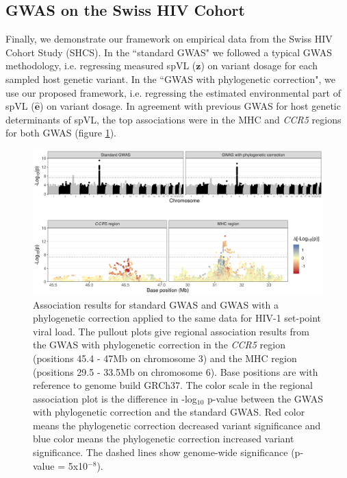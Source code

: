 \documentclass[]{article}
\begin{document}
\begin{doublespace}
\subsection{GWAS on the Swiss HIV Cohort}

Finally, we demonstrate our framework on empirical data from the Swiss HIV Cohort Study (SHCS). In the ``standard GWAS" we followed a typical GWAS methodology,  i.e. regressing measured spVL ($\bm{z}$) on variant dosage for each sampled host genetic variant. In the ``GWAS with phylogenetic correction", we use our proposed framework, i.e. regressing the estimated environmental part of spVL ($\bm{\hat{e}}$) on variant dosage. In agreement with previous GWAS for host genetic determinants of spVL, the top associations were in the MHC and \emph{CCR5} regions for both GWAS (figure \ref{fig:gwas-results}). 

\begin{figure}[H]
	\begin{center}
		\includegraphics[width=\linewidth]{figures_archived/200207_gwas_results}
		\caption{Association results for standard GWAS and GWAS with a phylogenetic correction applied to the same data for HIV-1 set-point viral load. The pullout plots give regional association results from the GWAS with phylogenetic correction in the \emph{CCR5} region (positions 45.4 - 47Mb on chromosome 3) and the MHC region (positions 29.5 - 33.5Mb on chromosome 6). Base positions are with reference to genome build GRCh37. The color scale in the regional association plot is the difference in -log$_{10}$ p-value between the GWAS with phylogenetic correction and the standard GWAS. Red color means the phylogenetic correction decreased variant significance and blue color means the phylogenetic correction increased variant significance. The dashed lines show genome-wide significance (p-value = 5x10$^{-8}$).}
		\label{fig:gwas-results}
	\end{center}
\end{figure}


\end{doublespace}
\end{document}
